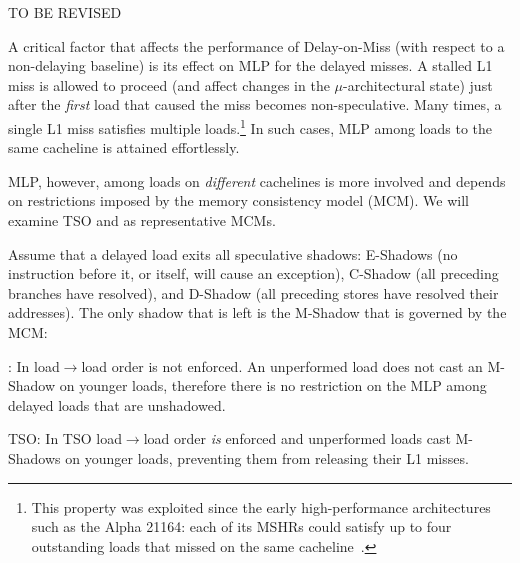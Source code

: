 \iffalse

{\color{red} TO BE REVISED

A critical factor that affects the performance of Delay-on-Miss (with respect to a non-delaying baseline) is its effect on MLP for the delayed misses. 
A stalled L1 miss is allowed to proceed (and affect changes in the $\mu$-architectural state) just after the \emph{first} load that caused the miss becomes non-speculative.
Many times, a single L1 miss satisfies multiple loads.\footnote{This property was exploited since the early high-performance architectures such as the Alpha 21164: each of its MSHRs could satisfy up to four outstanding loads that missed on the same cacheline~\cite{alpha21164}.} 
In such cases, MLP among loads to the same cacheline is attained effortlessly.

MLP, however, among loads on \emph{different} cachelines is more involved and depends on restrictions imposed by the memory consistency model (MCM). We will examine TSO and {\rc} as representative MCMs.

Assume that a delayed load exits all speculative shadows: E-Shadows (no instruction before it, or itself, will cause an exception), C-Shadow (all preceding branches have resolved), and D-Shadow (all preceding stores have resolved their addresses). The only shadow that is left is the M-Shadow that is governed by the MCM:
\squishlist
\item {\rc}: In {\rc} load$\rightarrow$load order is not enforced. An unperformed load does not cast an M-Shadow on younger loads, therefore there is no restriction on the MLP among delayed loads that are unshadowed.
\item TSO: In TSO load$\rightarrow$load order \emph{is} enforced and unperformed loads cast M-Shadows on younger loads, preventing them from releasing their L1 misses. %
\squishend



}

